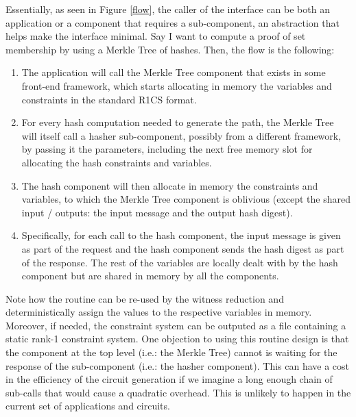 Essentially, as seen in Figure \ref{flow}, the caller of the interface can be both an application or a component that requires a sub-component, an abstraction that helps make the interface minimal. Say I want to compute a proof of set membership by using a Merkle Tree of hashes. Then, the flow is the following:
\begin{enumerate} 
	\item The application will call the Merkle Tree component that exists in some front-end framework, which starts allocating in memory the variables and constraints in the standard R1CS format.
	\item For every hash computation needed to generate the path, the Merkle Tree will itself call a hasher sub-component, possibly from a different framework, by passing it the parameters, including the next free memory slot for allocating the hash constraints and variables.
	\item The hash component will then allocate in memory the constraints and variables, to which the Merkle Tree component is oblivious (except the shared input / outputs: the input message and the output hash digest).
	\item Specifically, for each call to the hash component, the input message is given as part of the request and the hash component sends the hash digest as part of the response. The rest of the variables are locally dealt with by the hash component but are shared in memory by all the components.
\end{enumerate}

Note how the routine can be re-used by the witness reduction and deterministically assign the values to the respective variables in memory. Moreover, if needed, the constraint system can be outputed as a file containing a static rank-1 constraint system. One objection to using this routine design is that the component at the top level (i.e.: the Merkle Tree) cannot is waiting for the response of the sub-component (i.e.: the hasher component). This can have a cost in the efficiency of the circuit generation if we imagine a long enough chain of sub-calls that would cause a quadratic overhead. This is unlikely to happen in the current set of applications and circuits. 
	
